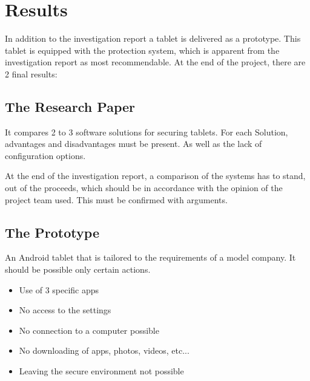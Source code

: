 \section*{Results}
In addition to the investigation report a tablet is delivered as a prototype. This tablet is equipped with the protection system, which is apparent from the investigation report as most recommendable.
\newline At the end of the project, there are 2 final results:
\subsection*{The Research Paper}
It compares 2 to 3 software solutions for securing tablets. For each Solution, advantages and disadvantages must be present. As well as the lack of configuration options.

At the end of the investigation report, a comparison of the systems has to stand, out of the proceeds, which should be in accordance with the opinion of the project team used. This must be confirmed with arguments.
\newpage
\subsection*{The Prototype}
An Android tablet that is tailored to the requirements of a model company. It should be possible only certain actions.
\begin{itemize}
	\item Use of 3 specific apps
	\item No access to the settings
	\item No connection to a computer possible
	\item No downloading of apps, photos, videos, etc...
	\item Leaving the secure environment not possible
\end{itemize}
